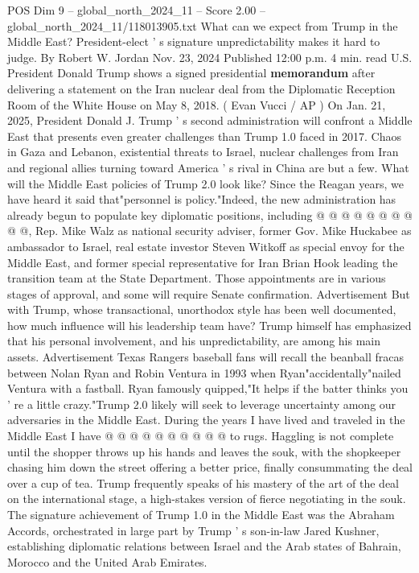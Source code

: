 \begin{textsample}{POS Dim 9 – global\_north\_2024\_11 – Score 2.00 – global\_north\_2024\_11/118013905.txt}  \label{ex:f9_pos_236}
What can we expect from Trump in the Middle East?
President-elect ' s signature unpredictability makes it hard to judge.
By Robert W.
Jordan Nov. 23, 2024 Published 12:00 p.m. 4 min. read U.S.
President Donald Trump shows a signed presidential \textbf{memorandum} after delivering a statement on the Iran nuclear deal from the Diplomatic Reception Room of the White House on May 8, 2018. ( Evan Vucci / AP ) On Jan. 21, 2025, President Donald J.
Trump ' s second administration will confront a Middle East that presents even greater challenges than Trump 1.0 faced in 2017.
Chaos in Gaza and Lebanon, existential threats to Israel, nuclear challenges from Iran and regional allies turning toward America ' s rival in China are but a few.
What will the Middle East policies of Trump 2.0 look like?
Since the Reagan years, we have heard it said that"personnel is policy."Indeed, the new administration has already begun to populate key diplomatic positions, including @ @ @ @ @ @ @ @ @ @, Rep.
Mike Walz as national security adviser, former Gov.
Mike Huckabee as ambassador to Israel, real estate investor Steven Witkoff as special envoy for the Middle East, and former special representative for Iran Brian Hook leading the transition team at the State Department.
Those appointments are in various stages of approval, and some will require Senate confirmation.
Advertisement But with Trump, whose transactional, unorthodox style has been well documented, how much influence will his leadership team have?
Trump himself has emphasized that his personal involvement, and his unpredictability, are among his main assets.
Advertisement Texas Rangers baseball fans will recall the beanball fracas between Nolan Ryan and Robin Ventura in 1993 when Ryan"accidentally"nailed Ventura with a fastball.
Ryan famously quipped,"It helps if the batter thinks you ' re a little crazy."Trump 2.0 likely will seek to leverage uncertainty among our adversaries in the Middle East.
During the years I have lived and traveled in the Middle East I have @ @ @ @ @ @ @ @ @ @ to rugs.
Haggling is not complete until the shopper throws up his hands and leaves the souk, with the shopkeeper chasing him down the street offering a better price, finally consummating the deal over a cup of tea.
Trump frequently speaks of his mastery of the art of the deal on the international stage, a high-stakes version of fierce negotiating in the souk.
The signature achievement of Trump 1.0 in the Middle East was the Abraham Accords, orchestrated in large part by Trump ' s son-in-law Jared Kushner, establishing diplomatic relations between Israel and the Arab states of Bahrain, Morocco and the United Arab Emirates.

\end{textsample}
